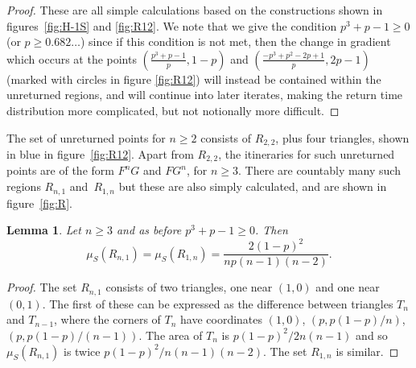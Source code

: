 \documentclass{iopart}
\newtheorem{lemma}{Lemma}
\begin{document}
\begin{proof}
These are all simple calculations based on the constructions shown in figures~\ref{fig:H-1S} and \ref{fig:R12}. We note that we give the condition 
$p^3 + p - 1 \ge 0$  (or $ p \ge 0.682\ldots$) since if this condition is 
not met, then the change in gradient which occurs at the points $(\frac{p^3+p-1}{p},1-p)$ and $(\frac{-p^3 + p^2 - 2p + 1}{p},2p-1)$ (marked with circles in figure \ref{fig:R12}) will instead be contained within the unreturned regions, and will continue into later iterates, making the return 
time distribution more complicated, but not notionally more difficult.
\end{proof}




The set of unreturned points for $n \ge 2$ consists of $R_{2,2}$, plus four triangles, shown in blue in figure~\ref{fig:R12}. Apart from $R_{2,2}$, the itineraries for such unreturned points are of the form $F^n G$ and $FG^n$, for $n \ge 3$. There are countably many such regions $R_{n,1}$ and~$R_{1,n}$ but these are also simply calculated, and are shown in figure~\ref{fig:R}.
\begin{lemma}\label{lem:Rcountable}
Let $n \ge 3$ and as before $p^3 + p - 1 \ge 0$. Then 
\begin{equation*}
\mu_S(R_{n,1}) = \mu_S(R_{1,n}) = \frac{2(1-p)^2}{np(n-1)(n-2)}.
\end{equation*}
\end{lemma}

\begin{proof}
The set $R_{n,1}$ consists of two triangles, one near $(1,0)$ and one near $(0,1)$. The first of these can be expressed as the difference between triangles $T_n$ and $T_{n-1}$, where the corners of $T_n$ have coordinates $(1,0)$, $(p,p(1-p)/n)$, $(p,p(1-p)/(n-1))$. The area of $T_n$ is $p(1-p)^2/2n(n-1)$ and so $\mu_S(R_{n,1})$ is twice $p(1-p)^2/n(n-1)(n-2)$. The set $R_{1,n}$ is similar.
\end{proof}
\end{document}
